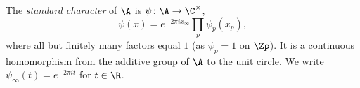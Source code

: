 The \emph{standard character} of $\A$ is $\psi\colon\A\to\C^\times$,
\[
  \psi(x)=e^{-2\pi ix_\infty}\prod_p\psi_p(x_p),
\]
where all but finitely many factors equal $1$ (as $\psi_p=1$ on $\Zp$). It is a continuous homomorphism from the additive
group of $\A$ to the unit circle. We write $\psi_\infty(t)=e^{-2\pi it}$ for $t\in\R$.
